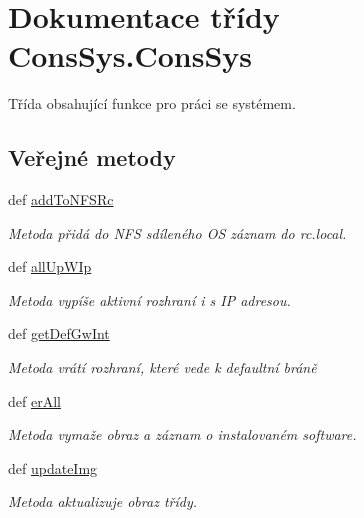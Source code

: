 \hypertarget{classConsSys_1_1ConsSys}{\section{Dokumentace třídy Cons\-Sys.\-Cons\-Sys}
\label{d9/d30/classConsSys_1_1ConsSys}
}


Třída obsahující funkce pro práci se systémem.  


\subsection*{Veřejné metody}
\begin{DoxyCompactItemize}
\item 
def \hyperlink{classConsSys_1_1ConsSys_adf24487ed82251edc0dcd15aacd08bc0}{add\-To\-N\-F\-S\-Rc}
\begin{DoxyCompactList}\small\item\em Metoda přidá do N\-F\-S sdíleného O\-S záznam do rc.\-local. \end{DoxyCompactList}\item 
def \hyperlink{classConsSys_1_1ConsSys_ab1178d112f29926dcf781430cbd417fe}{all\-Up\-W\-Ip}
\begin{DoxyCompactList}\small\item\em Metoda vypíše aktivní rozhraní i s I\-P adresou. \end{DoxyCompactList}\item 
def \hyperlink{classConsSys_1_1ConsSys_a676ae0d38fa6aea12ab2dce4381ff872}{get\-Def\-Gw\-Int}
\begin{DoxyCompactList}\small\item\em Metoda vrátí rozhraní, které vede k defaultní bráně \end{DoxyCompactList}\item 
def \hyperlink{classConsSys_1_1ConsSys_a97a5ac1a37c9649118069803b50c3102}{er\-All}
\begin{DoxyCompactList}\small\item\em Metoda vymaže obraz a záznam o instalovaném software. \end{DoxyCompactList}\item 
def \hyperlink{classConsSys_1_1ConsSys_a4116e6cfbf38f6a6ae7eb6ccc8a545b8}{update\-Img}
\begin{DoxyCompactList}\small\item\em Metoda aktualizuje obraz třídy. \end{DoxyCompactList}\item 

\end{DoxyCompactItemize}
